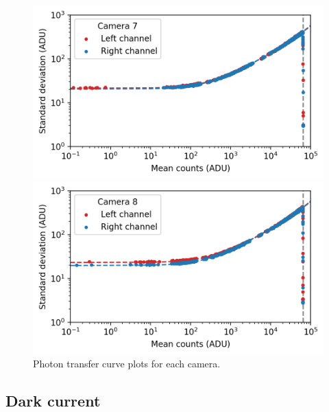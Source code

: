 \begin{colsection}
\begin{colsection}
\begin{figure}[p]
\begin{center}
        \begin{minipage}[t]{0.49\textwidth}\vspace{10pt}
            \includegraphics[width=\linewidth]{images/detectors/ptc_7.png}
        \end{minipage}
        \begin{minipage}[t]{0.49\textwidth}\vspace{10pt}
            \includegraphics[width=\linewidth]{images/detectors/ptc_8.png}
        \end{minipage}
    \end{center}
    \caption[Photon transfer curve plots]{
        Photon transfer curve plots for each camera.
    }\label{fig:ptcs}
\end{figure}

\clearpage

\end{colsection}

\newpage
\subsection{Dark current}
\label{sec:dc}
\begin{colsection}


\end{colsection}
\end{colsection}
